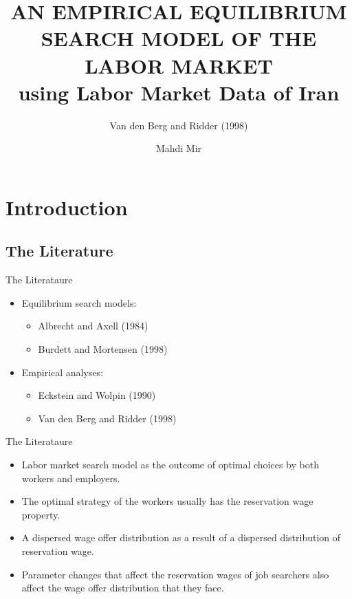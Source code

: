 \documentclass{beamer}
\title[]{AN EMPIRICAL EQUILIBRIUM SEARCH MODEL OF THE LABOR MARKET \\ using Labor Market Data of Iran}
\subtitle[]{Van den Berg and Ridder (1998)}
\author{Mahdi Mir}
\institute[]{TeIAS}
\begin{document}
\maketitle

\section{Introduction}
\subsection{The Literature}


\begin{frame}{The Literataure}
    \begin{itemize}
        \item Equilibrium search models:
              \begin{itemize}
                  \item Albrecht and Axell (1984)
                  \item Burdett and Mortensen (1998)
              \end{itemize}
        \item Empirical analyses:
              \begin{itemize}
                  \item Eckstein and Wolpin (1990)
                  \item Van den Berg and Ridder (1998)
              \end{itemize}
    \end{itemize}
\end{frame}


\begin{frame}{The Literataure}
    \begin{itemize}
        \item Labor market search model as the outcome of optimal choices by both workers and employers.
        \item The optimal strategy of the workers usually has the reservation wage property.
        \item A dispersed wage offer distribution as a result of a dispersed distribution of reservation wage.
        \item Parameter changes that affect the reservation wages of job searchers also affect the wage offer distribution that they face.
    \end{itemize}
\end{frame}
\end{document}
